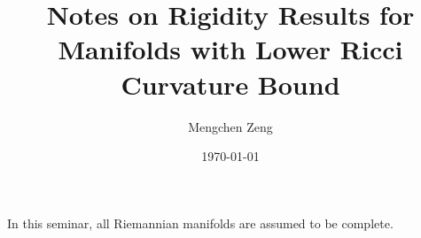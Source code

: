 \documentclass{amsart}
\title[Ricci Rigidity Notes]{Notes on Rigidity Results for Manifolds with Lower Ricci Curvature Bound}
\author{Mengchen Zeng}
\date{\today}
\theoremstyle{definition}
\theoremstyle{plain}
\theoremstyle{remark}
\numberwithin{equation}{section}
\begin{document}
\maketitle

In this seminar, all Riemannian manifolds are assumed to be complete.



\end{document}

